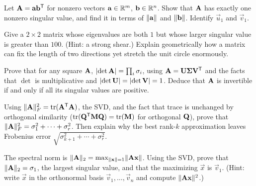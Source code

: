 \begin{exercise}
\label{ch29:ex-rankone}
Let $\mathbf{A} = \mathbf{a}\mathbf{b}^{\mathsf{T}}$ for nonzero vectors $\mathbf{a}\in\mathbb{R}^m$,
$\mathbf{b}\in\mathbb{R}^n$. Show that $\mathbf{A}$ has exactly one nonzero singular value, and
find it in terms of $\lVert\mathbf{a}\rVert$ and $\lVert\mathbf{b}\rVert$. Identify $\vec{u}_1$
and $\vec{v}_1$.
\end{exercise}

\begin{exercise}
\label{ch29:ex-svd-vs-eig}
Give a $2\times 2$ matrix whose eigenvalues are both $1$ but whose larger
singular value is greater than $100$. (Hint: a strong shear.) Explain
geometrically how a matrix can fix the length of two directions yet stretch the
unit circle enormously.
\end{exercise}

\begin{exercise}
\label{ch29:ex-det}
Prove that for any square $\mathbf{A}$, $\lvert\det\mathbf{A}\rvert = \prod_i \sigma_i$, using
$\mathbf{A} = \mathbf{U}\mathbf{\Sigma}\mathbf{V}^{\mathsf{T}}$ and the facts that $\det$ is
multiplicative and $\lvert\det\mathbf{U}\rvert = \lvert\det\mathbf{V}\rvert = 1$. Deduce that
$\mathbf{A}$ is invertible if and only if all its singular values are positive.
\end{exercise}

\begin{exercise}
\label{ch29:ex-frob}
Using $\lVert\mathbf{A}\rVert_F^2 = \operatorname{tr}(\mathbf{A}^{\mathsf{T}}\mathbf{A})$, the SVD, and the fact that
trace is unchanged by orthogonal similarity ($\operatorname{tr}(\mathbf{Q}^{\mathsf{T}}\mathbf{M}\mathbf{Q}) =
\operatorname{tr}(\mathbf{M})$ for orthogonal $\mathbf{Q}$), prove that
$\lVert\mathbf{A}\rVert_F^2 = \sigma_1^2 + \cdots + \sigma_r^2$. Then explain why the best
rank-$k$ approximation leaves Frobenius error
$\sqrt{\sigma_{k+1}^2 + \cdots + \sigma_r^2}$.
\end{exercise}

\begin{exercise}
\label{ch29:ex-spectral}
The spectral norm is $\lVert\mathbf{A}\rVert_2 = \max_{\lVert\mathbf{x}\rVert=1}\lVert\mathbf{A}\mathbf{x}\rVert$.
Using the SVD, prove that $\lVert\mathbf{A}\rVert_2 = \sigma_1$, the largest singular
value, and that the maximizing $\vec{x}$ is $\vec{v}_1$. (Hint: write $\vec{x}$ in
the orthonormal basis $\vec{v}_1,\dots,\vec{v}_n$ and compute
$\lVert\mathbf{A}\mathbf{x}\rVert^2$.)
\end{exercise}

